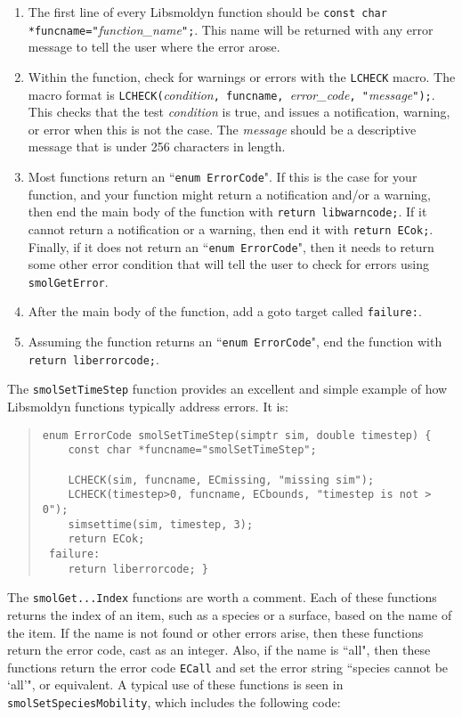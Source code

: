 \documentclass {book}
\begin{document}
\begin{enumerate}
\item The first line of every Libsmoldyn function should be \texttt{const char *funcname="}\emph{function\_name}\texttt{";}. This name will be returned with any error message to tell the user where the error arose.
\item Within the function, check for warnings or errors with the \texttt{LCHECK} macro. The macro format is \texttt{LCHECK(}\emph{condition}\texttt{, funcname, }\emph{error\_code}\texttt{, "}\emph{message}\texttt{");}. This checks that the test \emph{condition} is true, and issues a notification, warning, or error when this is not the case. The \emph{message} should be a descriptive message that is under 256 characters in length.
\item Most functions return an ``\texttt{enum ErrorCode}". If this is the case for your function, and your function might return a notification and/or a warning, then end the main body of the function with \texttt{return libwarncode;}. If it cannot return a notification or a warning, then end it with \texttt{return ECok;}. Finally, if it does not return an ``\texttt{enum ErrorCode}", then it needs to return some other error condition that will tell the user to check for errors using \texttt{smolGetError}.
\item After the main body of the function, add a goto target called \texttt{failure:}.
\item Assuming the function returns an ``\texttt{enum ErrorCode}", end the function with \texttt{return liberrorcode;}.
\end{enumerate}

The \texttt{smolSetTimeStep} function provides an excellent and simple example of how Libsmoldyn functions typically address errors. It is:

\begin{quote}
\begin{lstlisting}
enum ErrorCode smolSetTimeStep(simptr sim, double timestep) {
	const char *funcname="smolSetTimeStep";

	LCHECK(sim, funcname, ECmissing, "missing sim");
	LCHECK(timestep>0, funcname, ECbounds, "timestep is not > 0");
	simsettime(sim, timestep, 3);
	return ECok;
 failure:
	return liberrorcode; }
\end{lstlisting}
\end{quote}

The \texttt{smolGet...Index} functions are worth a comment. Each of these functions returns the index of an item, such as a species or a surface, based on the name of the item. If the name is not found or other errors arise, then these functions return the error code, cast as an integer. Also, if the name is ``all", then these functions return the error code \texttt{ECall} and set the error string ``species cannot be `all'", or equivalent. A typical use of these functions is seen in \texttt{smolSetSpeciesMobility}, which includes the following code:
\end{document}
